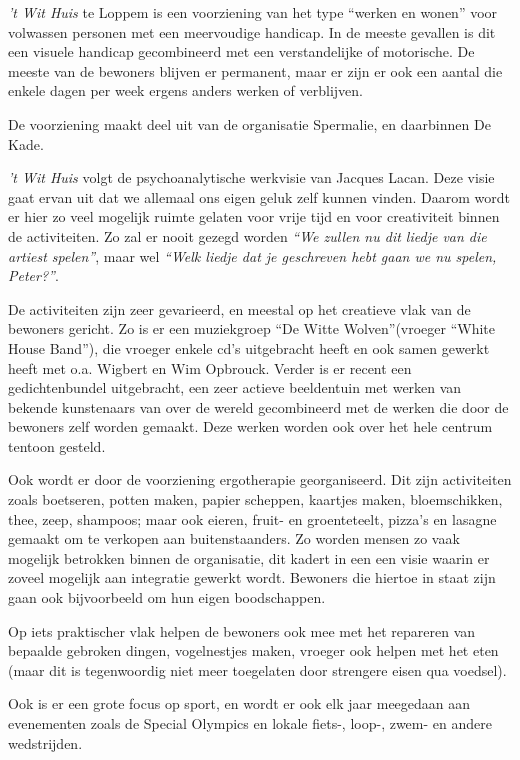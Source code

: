 \documentclass[a4paper,12pt]{article}
\begin{document}
\emph{’t Wit Huis} te Loppem is een voorziening van het type ``werken en wonen'' voor volwassen personen met een meervoudige handicap. In de meeste gevallen is dit een visuele handicap gecombineerd met een verstandelijke of motorische. De meeste van de bewoners blijven er permanent, maar er zijn er ook een aantal die enkele dagen per week ergens anders werken of verblijven.

De voorziening maakt deel uit van de organisatie Spermalie, en daarbinnen De Kade.

\emph{’t Wit Huis} volgt de psychoanalytische werkvisie van Jacques Lacan. Deze visie gaat ervan uit dat we allemaal ons eigen geluk zelf kunnen vinden. Daarom wordt er hier zo veel mogelijk ruimte gelaten voor vrije tijd en voor creativiteit binnen de activiteiten. Zo zal er nooit gezegd worden \emph{``We zullen nu dit liedje van die artiest spelen''}, maar wel \emph{``Welk liedje dat je geschreven hebt gaan we nu spelen, Peter?''}.

De activiteiten zijn zeer gevarieerd, en meestal op het creatieve vlak van de bewoners gericht. Zo is er een muziekgroep ``De Witte Wolven''(vroeger ``White House Band''), die vroeger enkele cd's uitgebracht heeft en ook samen gewerkt heeft met o.a. Wigbert en Wim Opbrouck. Verder is er recent een gedichtenbundel uitgebracht, een zeer actieve beeldentuin met werken van bekende kunstenaars van over de wereld gecombineerd met de werken die door de bewoners zelf worden gemaakt. Deze werken worden ook over het hele centrum tentoon gesteld.

Ook wordt er door de voorziening ergotherapie georganiseerd. Dit zijn activiteiten zoals boetseren, potten maken, papier scheppen, kaartjes maken, bloemschikken, thee, zeep, shampoos; maar ook eieren, fruit- en groenteteelt, pizza's en lasagne gemaakt om te verkopen aan buitenstaanders. Zo worden mensen zo vaak mogelijk betrokken binnen de organisatie, dit kadert in een een visie waarin er zoveel mogelijk aan integratie gewerkt wordt. Bewoners die hiertoe in staat zijn gaan ook bijvoorbeeld om hun eigen boodschappen.

Op iets praktischer vlak helpen de bewoners ook mee met het repareren van bepaalde gebroken dingen, vogelnestjes maken, vroeger ook helpen met het eten (maar dit is tegenwoordig niet meer toegelaten door strengere eisen qua voedsel).

Ook is er een grote focus op sport, en wordt er ook elk jaar meegedaan aan evenementen zoals de Special Olympics en lokale fiets-, loop-, zwem- en andere wedstrijden.
\end{document}

